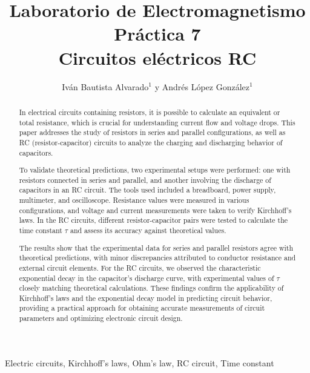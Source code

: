\documentclass[article,12pt]{elsarticle}
\begin{document}
\begin{frontmatter}
    \title{Laboratorio de Electromagnetismo \\  Práctica  7\\ 
        Circuitos eléctricos RC}
    \author{Iván Bautista Alvarado$^1$ y Andrés López González$^1$} %
    \address{$^1$ Facultad de Ciencias, Universidad Nacional Autónoma de México, M\'exico CDMX.}


    \begin{abstract}
In electrical circuits containing resistors, it is possible to calculate an equivalent or total resistance, which is crucial for understanding current flow and voltage drops. This paper addresses the study of resistors in series and parallel configurations, as well as RC (resistor-capacitor) circuits to analyze the charging and discharging behavior of capacitors.

To validate theoretical predictions, two experimental setups were performed: one with resistors connected in series and parallel, and another involving the discharge of capacitors in an RC circuit. The tools used included a breadboard, power supply, multimeter, and oscilloscope. Resistance values were measured in various configurations, and voltage and current measurements were taken to verify Kirchhoff’s laws. In the RC circuits, different resistor-capacitor pairs were tested to calculate the time constant \( \tau \) and assess its accuracy against theoretical values.

The results show that the experimental data for series and parallel resistors agree with theoretical predictions, with minor discrepancies attributed to conductor resistance and external circuit elements. For the RC circuits, we observed the characteristic exponential decay in the capacitor's discharge curve, with experimental values of \( \tau \) closely matching theoretical calculations. These findings confirm the applicability of Kirchhoff’s laws and the exponential decay model in predicting circuit behavior, providing a practical approach for obtaining accurate measurements of circuit parameters and optimizing electronic circuit design.

\end{abstract}

    \begin{keyword}
     Electric circuits, Kirchhoff's laws, Ohm's law, RC circuit, Time constant
    \end{keyword}
\end{frontmatter}
\end{document}
